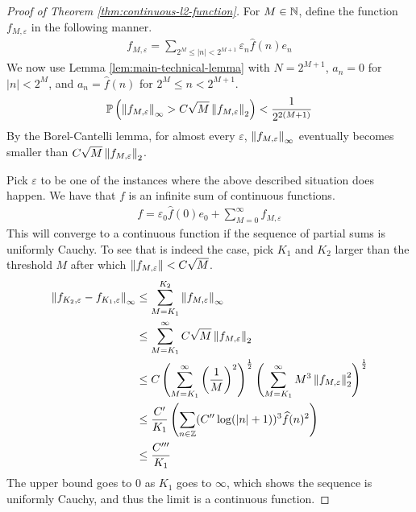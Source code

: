 \documentclass[11pt]{article}
\begin{document}
\begin{proof}[Proof of Theorem \ref{thm:continuous-l2-function}]
  For $M \in \mathbb{N}$, define the function $f_{M, \varepsilon}$ in the following manner.
  \begin{align*}
    f_{M, \varepsilon} = \sum_{2^M \leq |n| < 2^{M+1}} \varepsilon_n \widehat{f}(n) e_n
  \end{align*}
  We now use Lemma \ref{lem:main-technical-lemma} with $N = 2^{M+1}$, $a_n = 0$ for $|n| < 2^M$, and $a_n = \widehat{f}(n)$ for $2^M \leq n < 2^{M+1}$.
  \begin{align*}
    \mathbb{P}\left( \left\lVert f_{M,\varepsilon}\right\rVert_{\infty} > C \sqrt{M} \left\lVert f_{M,\varepsilon}\right\rVert_2 \right) < \frac{1}{2^{2(M+1)}}
  \end{align*}
  By the Borel-Cantelli lemma, for almost every $\varepsilon$, $\left\lVert f_{M, \varepsilon}\right\rVert_{\infty}$ eventually becomes smaller than $C\sqrt{M} \left\lVert f_{M,\varepsilon}\right\rVert_2$.

  Pick $\varepsilon$ to be one of the instances where the above described situation does happen.
  We have that $f$ is an infinite sum of continuous functions.
  \begin{align*}
    f = \varepsilon_0 \widehat{f}(0) e_0 + \sum_{M=0}^{\infty} f_{M, \varepsilon}
  \end{align*}
  This will converge to a continuous function if the sequence of partial sums is uniformly Cauchy.
  To see that is indeed the case, pick $K_1$ and $K_2$ larger than the threshold $M$ after which $\left\lVert f_{M, \varepsilon}\right\rVert < C\sqrt{M}$.
  \begin{align*}
    \left\lVert f_{K_2, \varepsilon} - f_{K_1, \varepsilon}\right\rVert_{\infty} &\leq \sum_{M=K_1}^{K_2} \left\lVert f_{M, \varepsilon}\right\rVert_{\infty} \\
                                                                &\leq \sum_{M=K_1}^\infty C \sqrt{M} \left\lVert f_{M, \varepsilon}\right\rVert_2 \\
                                                                &\leq C \left( \sum_{M=K_1}^{\infty} \left( \frac{1}{M} \right)^2 \right)^{\frac{1}{2}} \left( \sum_{M=K_1}^{\infty} M^3 \left\lVert f_{M, \varepsilon}\right\rVert_2^2 \right)^{\frac{1}{2}} \\
                                                                &\leq \frac{C^{\prime}}{K_1} \left( \sum_{n \in \mathbb{Z}} (C^{\prime \prime} \log(|n| + 1))^3 \widehat{f}(n)^2 \right) \\
    &\leq \frac{C^{\prime\prime\prime}}{K_1}
  \end{align*}
  The upper bound goes to $0$ as $K_1$ goes to $\infty$, which shows the sequence is uniformly Cauchy, and thus the limit is a continuous function.
\end{proof}
\end{document}
